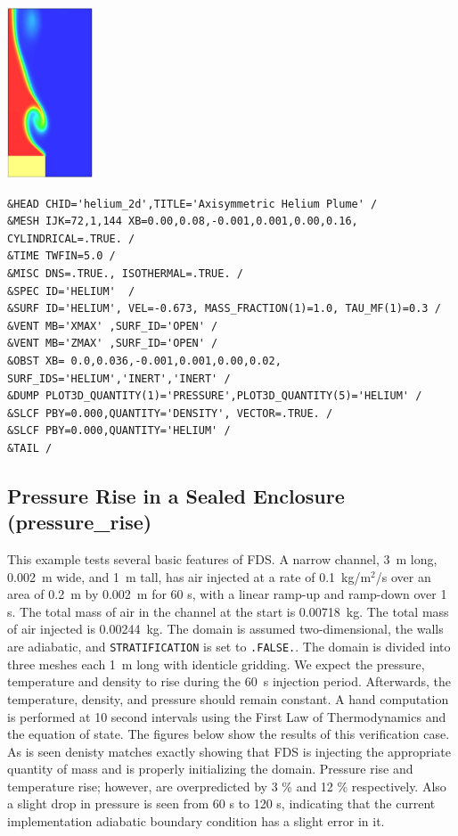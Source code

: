 \documentclass[11pt]{book}
\newcommand{\ct}{\tt\small}
\begin{document}
\vspace{0.2in}
\scriptsize
\noindent
\begin{minipage}{1.1in}
\includegraphics[height=2in]{FIGURES/helium_2d}
\end{minipage}
\hfill
\begin{minipage}{5.5in}
\begin{verbatim}
&HEAD CHID='helium_2d',TITLE='Axisymmetric Helium Plume' /
&MESH IJK=72,1,144 XB=0.00,0.08,-0.001,0.001,0.00,0.16, CYLINDRICAL=.TRUE. /
&TIME TWFIN=5.0 /
&MISC DNS=.TRUE., ISOTHERMAL=.TRUE. /
&SPEC ID='HELIUM'  /
&SURF ID='HELIUM', VEL=-0.673, MASS_FRACTION(1)=1.0, TAU_MF(1)=0.3 /
&VENT MB='XMAX' ,SURF_ID='OPEN' /
&VENT MB='ZMAX' ,SURF_ID='OPEN' /
&OBST XB= 0.0,0.036,-0.001,0.001,0.00,0.02, SURF_IDS='HELIUM','INERT','INERT' /
&DUMP PLOT3D_QUANTITY(1)='PRESSURE',PLOT3D_QUANTITY(5)='HELIUM' /
&SLCF PBY=0.000,QUANTITY='DENSITY', VECTOR=.TRUE. /
&SLCF PBY=0.000,QUANTITY='HELIUM' /
&TAIL /
\end{verbatim}
\end{minipage}
\normalsize


\clearpage

\subsection{Pressure Rise in a Sealed Enclosure ({\bf pressure\_rise})  }
\label{pressure_rise}

This example tests several basic features of FDS. A narrow channel, 3~m long, 0.002~m wide, and 1~m tall, has air injected at a rate of
0.1~kg/m$^2$/s over an area of 0.2~m by 0.002~m for 60 s, with a linear ramp-up and ramp-down over 1 s. The total mass of air in the channel at the start
is 0.00718~kg. The total mass of air injected is 0.00244~kg.
The domain is assumed two-dimensional, the walls are adiabatic, and {\ct STRATIFICATION} is set to {\ct .FALSE.}. The domain is divided into three
meshes each 1~m long with identicle gridding.  We expect the pressure,
 temperature and density to rise during the 60~s injection period. Afterwards, the
temperature, density, and pressure should remain constant. A hand computation is performed at 10 second intervals using the First Law of
Thermodynamics and the equation of state.  The figures below show the results of this verification case.  As is seen denisty
matches exactly showing that FDS is injecting the appropriate quantity of mass and is properly initializing the domain.
Pressure rise and temperature rise; however, are overpredicted by 3 \% and 12 \% respectively.  Also a slight drop in pressure
is seen from 60 s to 120 s, indicating that the current implementation adiabatic boundary condition has a slight error in it.
\end{document}
